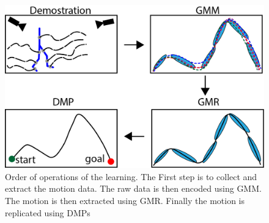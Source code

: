   

\begin{figure} 
    \centering 
    \includegraphics[scale=0.8]{images/demostation.png} 
    \caption{Order of operations of the learning. The First step is to collect and extract the motion data. The raw data is then encoded using GMM. The motion is then extracted using GMR. Finally the motion is replicated using DMPs } 
    \label{fig:demostation} 
\end{figure} 